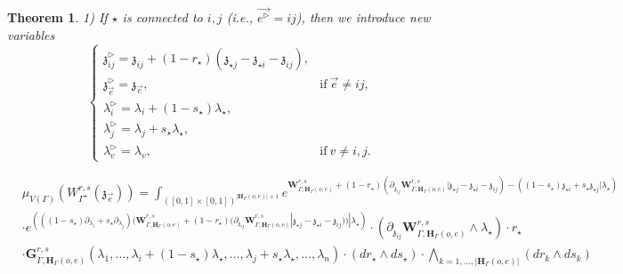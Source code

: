 \documentclass[11pt]{amsart}
\newtheorem{thm}{Theorem}[section]
\theoremstyle{definition}
\theoremstyle{remark}
\numberwithin{equation}{section}
\begin{document}
\begin{thm}
  1) If $\star$ is connected to $i,j$ (i.e., $\vec{e^\triangleright}=ij$), then we introduce new variables
  $$
  \begin{cases}
    \mathfrak{z}^\triangleright_{ij}=\mathfrak{z}_{ij}+(1-r_{\star})(\mathfrak{z}_{\star j}-\mathfrak{z}_{\star i}-\mathfrak{z}_{ij}), & \\
   \mathfrak{z}^\triangleright_{\vec{e}}=\mathfrak{z}_{\vec{e}} , & \mbox{if}\ \vec{e}\neq ij,\\
   \lambda^\triangleright_i= \lambda_i+(1-s_{\star})\lambda_{\star},&\\
   \lambda^\triangleright_j= \lambda_j+s_{\star}\lambda_{\star},&\\
   \lambda^\triangleright_v=\lambda_v,& \mbox{if}\ v\neq i,j.
  \end{cases}
  $$
 \iffalse
  $$
\mu_{V(\Gamma^{\star})}\left(W_{\Gamma^{\star}}(\mathfrak{z}_{\vec{e}})\right)=\int_{([0,1]\times[0,1])^{|\mathbf{H}_{\Gamma}(o,e)|+1}}e^{\mathbf{W}^{r,s}_{\Gamma,\mathbf{H}_{\Gamma}(o,e)}}\cdot \mathbf{G}^{r,s}_{\Gamma^{\star},\mathbf{H}_{\Gamma^{\star}}(o,e)}\cdot (dr_{\star}\wedge ds_{\star})\bigwedge_{k=1,\dots,|\mathbf{H}_{\Gamma^{\star}}(o,e)|} (dr_k\wedge ds_k)
$$
\fi
  \iffalse
\begin{align*}
& \mu_{V(\Gamma)}\left(W^{r,s}_{\Gamma^{\star}}(\mathfrak{z}_{\vec{e}})\right)  = \int_{([0,1]\times[0,1])^{|\mathbf{H}_{\Gamma}(o,e)|+1}} e^{\mathbf{W}^{r,s}_{\Gamma,\mathbf{H}_{\Gamma}(o,e)}+(1-r_{\star})\left(\partial_{\mathfrak{z}_{ij}}\mathbf{W}^{r,s}_{\Gamma,\mathbf{H}_{\Gamma}(o,e)}|\mathfrak{z}_{\star j}-\mathfrak{z}_{\star i}-\mathfrak{z}_{ij}\right)-\left((1-s_{\star})\mathfrak{z}_{\star i}+s_{\star}\mathfrak{z}_{\star j}|\lambda_{\star}\right)} \\
   & \cdot e^{\left(((1-s_{\star})\partial_{\lambda_i}+s_{\star}\partial_{\lambda_j})(\mathbf{W}^{r,s}_{\Gamma,\mathbf{H}_{\Gamma}(o,e)}+(1-r_{\star})(\partial_{\mathfrak{z}_{ij}}\mathbf{W}^{r,s}_{\Gamma,\mathbf{H}_{\Gamma}(o,e)}|\mathfrak{z}_{\star j}-\mathfrak{z}_{\star i}-\mathfrak{z}_{ij}))|\lambda_{\star}\right)}\cdot \left(\partial_{\mathfrak{z}_{ij}}\mathbf{W}^{r,s}_{\Gamma,\mathbf{H}_{\Gamma}(o,e)}\wedge\lambda_{\star}\right)\cdot r_{\star}\\
   &\cdot  \mathbf{G}^{r,s}_{\Gamma,\mathbf{H}_{\Gamma}(o,e)}(\lambda_1,\dots,\lambda_i+(1-s_{\star})\lambda_{\star},\dots,\lambda_j+s_{\star}\lambda_{\star},\dots,\lambda_{n})\cdot (dr_{\star}\wedge ds_{\star})\cdot \bigwedge_{k=1,\dots,|\mathbf{H}_{\Gamma}(o,e)|} (dr_k\wedge ds_k)
\end{align*}

\end{thm}
\end{document}
